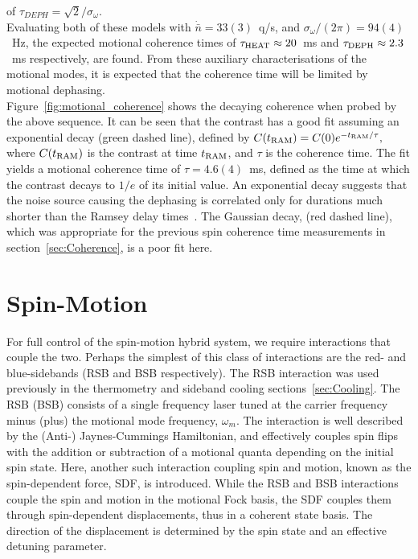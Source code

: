     of $\tau_{DEPH} = \sqrt{2}/\sigma_{\omega}$.\\
    Evaluating both of these models with $\dot{\bar{n}}=33(3)$~q/s, and
    $\sigma_{\omega}/(2\pi) = 94(4)$~\unit{\Hz}, the expected motional coherence times of $\tau_{\rm
    HEAT} \approx 20$~ms and $\tau_{\rm DEPH} \approx 2.3$~ms respectively, are found. From these auxiliary characterisations of the motional modes, it is expected that the coherence time will be limited by motional dephasing. \\
    Figure~\ref{fig:motional_coherence} shows the decaying coherence when probed by the above sequence. It can be seen that the contrast has a good fit assuming an exponential decay (green dashed line),
    defined by $C(t_{\rm RAM}) = C(0) e^{-t_{\rm RAM}/\tau},$ where $C(t_{\rm RAM})$ is the contrast at time $t_{\rm RAM}$, and $\tau$ is the coherence time. The fit yields a motional coherence time of $\tau = 4.6(4)$~\unit{\ms}, defined as the time at which the contrast decays to $1/e$ of its initial value. 
    An exponential decay suggests that the noise source causing the dephasing is correlated only for durations much shorter than the Ramsey delay times~\cite{omalley2015qubit}.
    The Gaussian decay, (red dashed line), which was appropriate for the previous spin coherence time measurements in section~\ref{sec:Coherence}, is a poor fit here. \\
    
    



\section{Spin-Motion}
    For full control of the spin-motion hybrid system, we require interactions
    that couple the two. Perhaps the simplest of this class of interactions
    are the red- and blue-sidebands (RSB and BSB respectively). The  RSB
    interaction was used previously in the thermometry and sideband cooling
    sections~\ref{sec:Cooling}. The RSB (BSB) consists of a single frequency
    laser tuned at the carrier frequency minus (plus) the motional mode frequency,
    $\omega_m$. The interaction is well described by the (Anti-) Jaynes-Cummings
    Hamiltonian, and effectively couples spin flips with the addition or
    subtraction of a motional quanta depending on the initial spin state. Here,
    another such interaction coupling spin and motion, known as the
    spin-dependent force, SDF, is introduced. 
    While the RSB and BSB interactions couple the spin and motion in the motional Fock basis, the SDF couples them through spin-dependent displacements, thus in a coherent state basis. The direction of the displacement is determined by the spin state and an effective detuning parameter.


